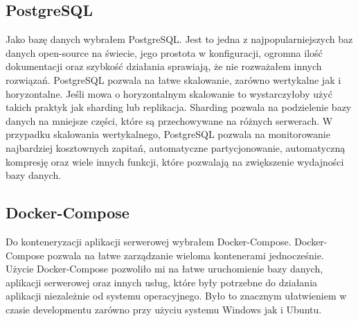 \subsection{PostgreSQL}\label{subsec:uzyte-technologie-postgresql}
Jako bazę danych wybrałem PostgreSQL.
Jest to jedna z najpopularniejszych baz danych open-source na świecie, jego prostota w konfiguracji, ogromna ilość dokumentacji oraz szybkość działania sprawiają, że nie rozważałem innych rozwiązań.
PostgreSQL pozwala na łatwe skalowanie, zarówno wertykalne jak i horyzontalne.
Jeśli mowa o horyzontalnym skalowanie to wystarczyłoby użyć takich praktyk jak sharding lub replikacja.
Sharding pozwala na podzielenie bazy danych na mniejsze części, które są przechowywane na różnych serwerach.
W przypadku skalowania wertykalnego, PostgreSQL pozwala na monitorowanie najbardziej kosztownych zapitań, automatyczne partycjonowanie, automatyczną kompresję oraz wiele innych funkcji, które pozwalają na zwiększenie wydajności bazy danych.

\subsection{Docker-Compose}\label{subsec:uzyte-technologie-docker-compose}
Do konteneryzacji aplikacji serwerowej wybrałem Docker-Compose.
Docker-Compose pozwala na łatwe zarządzanie wieloma kontenerami jednocześnie.
Użycie Docker-Compose pozwoliło mi na łatwe uruchomienie bazy danych, aplikacji serwerowej oraz innych usług, które były potrzebne do działania aplikacji niezależnie od systemu operacyjnego.
Było to znacznym ułatwieniem w czasie developmentu zarówno przy użyciu systemu Windows jak i Ubuntu.
\cite{postgresSharding}
